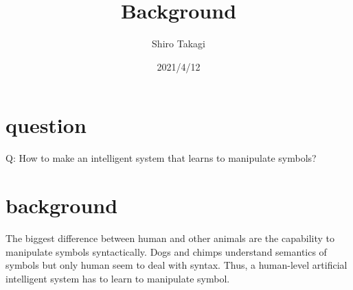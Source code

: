 \documentclass[12pt]{article}
\begin{document}
\title{Background}
\author{Shiro Takagi}
\date{2021/4/12}
\maketitle

\section{question}
Q: How to make an intelligent system that learns to manipulate symbols?

\section{background}
The biggest difference between human and other animals are 
the capability to manipulate symbols syntactically. Dogs and chimps understand 
semantics of symbols but only human seem to deal with syntax. Thus, a 
human-level artificial intelligent system has to learn to manipulate symbol.
\end{document}
